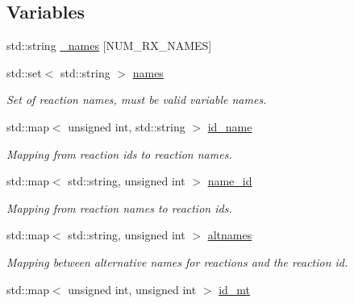 \subsection*{Variables}
\begin{DoxyCompactItemize}
\item 
std\+::string \hyperlink{namespacepyne_1_1rxname_a880e1a059fe54b6fd425cc3319978555}{\+\_\+names} \mbox{[}N\+U\+M\+\_\+\+R\+X\+\_\+\+N\+A\+M\+ES\mbox{]}
\item 
std\+::set$<$ std\+::string $>$ \hyperlink{namespacepyne_1_1rxname_a28dfc07e16c270b89549889be5d3146d}{names}\hypertarget{namespacepyne_1_1rxname_a28dfc07e16c270b89549889be5d3146d}{}\label{namespacepyne_1_1rxname_a28dfc07e16c270b89549889be5d3146d}

\begin{DoxyCompactList}\small\item\em Set of reaction names, must be valid variable names. \end{DoxyCompactList}\item 
std\+::map$<$ unsigned int, std\+::string $>$ \hyperlink{namespacepyne_1_1rxname_a28e72f5e8a19c035368e0eb72b2947d5}{id\+\_\+name}\hypertarget{namespacepyne_1_1rxname_a28e72f5e8a19c035368e0eb72b2947d5}{}\label{namespacepyne_1_1rxname_a28e72f5e8a19c035368e0eb72b2947d5}

\begin{DoxyCompactList}\small\item\em Mapping from reaction ids to reaction names. \end{DoxyCompactList}\item 
std\+::map$<$ std\+::string, unsigned int $>$ \hyperlink{namespacepyne_1_1rxname_a615522d66adc558775f60c559b3127fe}{name\+\_\+id}\hypertarget{namespacepyne_1_1rxname_a615522d66adc558775f60c559b3127fe}{}\label{namespacepyne_1_1rxname_a615522d66adc558775f60c559b3127fe}

\begin{DoxyCompactList}\small\item\em Mapping from reaction names to reaction ids. \end{DoxyCompactList}\item 
std\+::map$<$ std\+::string, unsigned int $>$ \hyperlink{namespacepyne_1_1rxname_a7109ca2a2a6aea74d372262172e3a203}{altnames}\hypertarget{namespacepyne_1_1rxname_a7109ca2a2a6aea74d372262172e3a203}{}\label{namespacepyne_1_1rxname_a7109ca2a2a6aea74d372262172e3a203}

\begin{DoxyCompactList}\small\item\em Mapping between alternative names for reactions and the reaction id. \end{DoxyCompactList}\item 
std\+::map$<$ unsigned int, unsigned int $>$ \hyperlink{namespacepyne_1_1rxname_a94ff01a63e221db69f259fa48616d3d5}{id\+\_\+mt}\hypertarget{namespacepyne_1_1rxname_a94ff01a63e221db69f259fa48616d3d5}{}\label{namespacepyne_1_1rxname_a94ff01a63e221db69f259fa48616d3d5}


\end{DoxyCompactItemize}

